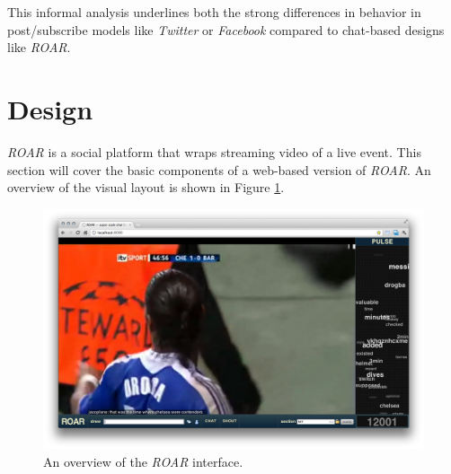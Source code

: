 This informal analysis underlines both the strong differences in behavior in post/subscribe models like \emph{Twitter} or \emph{Facebook} compared to chat-based designs like \emph{ROAR}.










\section{Design}

\emph{ROAR} is a social platform that wraps streaming video of a live event. This section will cover the basic components of a web-based version of \emph{ROAR}. An overview of the visual layout is shown in Figure \ref{fig:roar_overview}. 

\begin{figure}
	\includegraphics{figures/roar/overview.png}
	\caption{An overview of the \emph{ROAR} interface.}
	\label{fig:roar_overview}
\end{figure}


